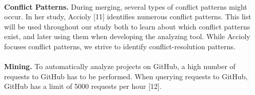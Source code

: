 \paragraph*{}
\textbf{Conflict Patterns.} During merging, several types of conflict patterns might occur. In her study, Accioly [11] identifies numerous conflict patterns. This list will be used throughout our study both to learn about which conflict patterns exist, and later using them when developing the analyzing tool. While Accioly focuses conflict patterns, we strive to identify conflict-resolution patterns.

\paragraph*{}
\textbf{Mining.} To automatically analyze projects on GitHub, a high number of requests to GitHub has to be performed. When querying requests to GitHub, GitHub has a limit of 5000 requests per hour [12].